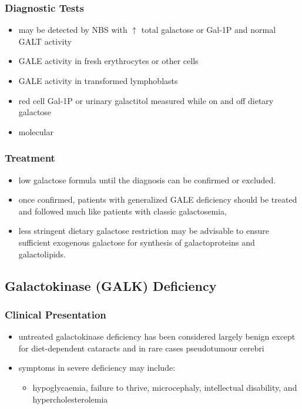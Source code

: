 \documentclass{scrartcl}
\begin{document}
\subsubsection{Diagnostic Tests}
\label{sec:org68a5915}
\begin{itemize}
\item may be detected by NBS with \(\uparrow\) total galactose or Gal-1P and normal GALT activity
\item GALE activity in fresh erythrocytes or other cells
\item GALE activity in transformed lymphoblasts
\item red cell Gal-1P or urinary galactitol measured while on and off dietary galactose
\item molecular
\end{itemize}

\subsubsection{Treatment}
\label{sec:orgb207848}
\begin{itemize}
\item low galactose formula until the diagnosis can be confirmed or excluded.
\item once confirmed, patients with generalized GALE deficiency should be
treated and followed much like patients with classic galactosemia,
\item less stringent dietary galactose restriction may be advisable to
ensure sufficient exogenous galactose for synthesis of galactoproteins and galactolipids.
\end{itemize}
\subsection{Galactokinase (GALK) Deficiency}
\label{sec:org160aa1b}
\subsubsection{Clinical Presentation}
\label{sec:orga44d187}
\begin{itemize}
\item untreated galactokinase deficiency has been considered largely
benign except for diet-dependent cataracts and in rare cases pseudotumour cerebri
\item symptoms in severe deficiency may include:
\begin{itemize}
\item hypoglycaemia, failure to thrive, microcephaly, intellectual
disability, and hypercholesterolemia
\end{itemize}
\end{itemize}
\end{document}
